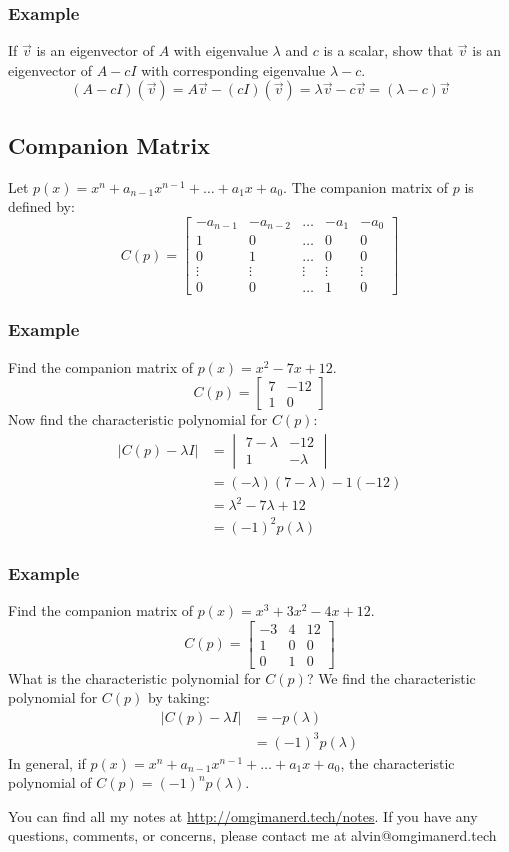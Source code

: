 \documentclass{math}
\begin{document}
\subsubsection*{Example}
If \( \vec{v} \) is an eigenvector of \( A \) with eigenvalue \( \lambda \) and
\( c \) is a scalar, show that \( \vec{v} \) is an eigenvector of \( A-cI \)
with corresponding eigenvalue \( \lambda-c \).
\[ (A-cI)(\vec{v}) = A\vec{v}-(cI)(\vec{v}) = \lambda\vec{v}-c\vec{v} =
  (\lambda-c)\vec{v} \]

\subsection*{Companion Matrix}
Let \( p(x) = x^n+a_{n-1}x^{n-1}+\dots+a_1x+a_0 \). The companion matrix of
\( p \) is defined by:
\[ C(p) = \begin{bmatrix}
  -a_{n-1} & -a_{n-2} & \dots & -a_1 & -a_0 \\
  1 & 0 & \dots & 0 & 0 \\
  0 & 1 & \dots & 0 & 0 \\
  \vdots & \vdots & \vdots & \vdots & \vdots \\
  0 & 0 & \dots & 1 & 0
\end{bmatrix} \]

\subsubsection*{Example}
Find the companion matrix of \( p(x) = x^2-7x+12 \).
\[ C(p) = \begin{bmatrix}7 & -12 \\ 1 & 0\end{bmatrix} \]
Now find the characteristic polynomial for \( C(p) \):
\begin{align*}
  |C(p)-\lambda I| &= \begin{vmatrix}
    7-\lambda & -12 \\
    1 & -\lambda
  \end{vmatrix} \\
  &= (-\lambda)(7-\lambda)-1(-12) \\
  &= \lambda^2-7\lambda+12 \\
  &= (-1)^2p(\lambda)
\end{align*}

\subsubsection*{Example}
Find the companion matrix of \( p(x) = x^3+3x^2-4x+12 \).
\[ C(p) = \begin{bmatrix}
  -3 & 4 & 12 \\
  1 & 0 & 0 \\
  0 & 1 & 0
\end{bmatrix} \]
What is the characteristic polynomial for \( C(p) \)? We find the characteristic
polynomial for \( C(p) \) by taking:
\begin{align*}
  |C(p)-\lambda I| &= -p(\lambda) \\
  &= (-1)^3p(\lambda)
\end{align*}
In general, if \( p(x) = x^n+a_{n-1}x^{n-1}+\dots+a_1x+a_0 \), the
characteristic polynomial of \( C(p) = (-1)^np(\lambda) \).

\begin{center}
  You can find all my notes at \url{http://omgimanerd.tech/notes}. If you have
  any questions, comments, or concerns, please contact me at
  alvin@omgimanerd.tech
\end{center}
\end{document}
